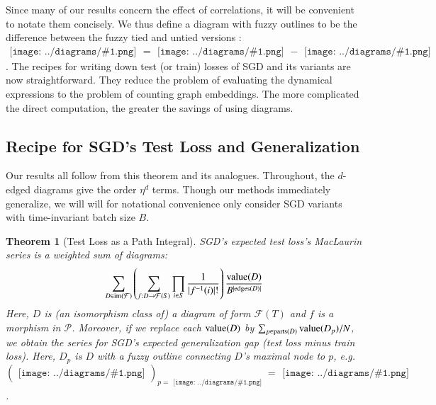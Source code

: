 \documentclass{article}
\newtheorem{thm}{Theorem}
\newcommand{\Free}{\mathcal{F}}
\newcommand{\image}{\text{\textnormal{im}}}
\newcommand{\dvalue}{\text{\textnormal{value}}}
\newcommand{\edges}{\text{\textnormal{edges}}}
\newcommand{\parts}{\text{\textnormal{parts}}}
\newcommand{\Pp}{\mathcal{P}}
\newcommand{\sdia}[1]{\begin{gathered}\texttt{[image: ../diagrams/\#1.png]}\end{gathered}}
\begin{document}
        Since many of our results concern the effect of correlations, it will
        be convenient to notate them concisely.  We thus define a diagram with
        fuzzy outlines to be the difference between the fuzzy tied and untied
        versions : $\sdia{c(01-2)(01-12)} =
        \sdia{(01-2)(01-12)}-\sdia{(0-1-2)(01-12)}$.  
        The recipes for writing down test (or train) losses of SGD and its
        variants are now straightforward.  They reduce the problem of
        evaluating the dynamical expressions to the problem of
        counting graph embeddings.  The more complicated the direct
        computation, the greater the savings of using diagrams.  
    

    \subsection{Recipe for SGD's Test Loss and Generalization}

        Our results all follow from this theorem and its analogues.
        Throughout, the $d$-edged diagrams give the order $\eta^d$ terms.
        Though our methods immediately generalize, we will will for notational
        convenience only consider SGD variants with time-invariant batch size
        $B$. 
        \begin{thm}[Test Loss as a Path Integral] \label{thm:test}
            SGD's expected test loss's MacLaurin series
            is a weighted sum of diagrams:
            \begin{equation}\label{eq:sgdcoef}
                \sum_{D \in \image(\Free)}
                \left(
                    \sum_{f: D\to\Free(S)}
                    \prod_{i\in S} \frac{1}{|f^{-1}(i)|!}
                \right)
                \frac{\dvalue(D)}{B^{|\edges(D)|}}
            \end{equation}
            Here, $D$ is (an isomorphism class of) a diagram of form
            $\Free(T)$ and $f$ is a morphism in $\Pp$.
            Moreover, if we replace each $\dvalue(D)$ by
            $
                \sum_{p \in \parts(D)} \dvalue(D_p)/N
            $, we obtain the series for
            SGD's expected generalization gap (test loss minus train loss).
            Here, $D_p$ is $D$ with a fuzzy outline connecting $D$'s maximal
            node to $p$, e.g. $(\sdia{(0-1)(01)})_{p=\sdia{(0)()}} =
            \sdia{c(01)(01)}$.
        \end{thm}
    
\end{document}
